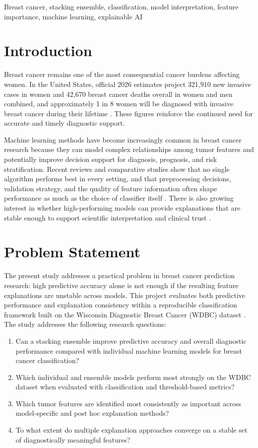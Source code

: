\documentclass[conference]{IEEEtran}
\begin{document}
\begin{IEEEkeywords}
Breast cancer, stacking ensemble, classification, model interpretation, feature importance, machine learning, explainable AI
\end{IEEEkeywords}

\section{Introduction}
Breast cancer remains one of the most consequential cancer burdens affecting women. In the United States, official 2026 estimates project 321,910 new invasive cases in women and 42,670 breast cancer deaths overall in women and men combined, and approximately 1 in 8 women will be diagnosed with invasive breast cancer during their lifetime \cite{b1,b2}. These figures reinforce the continued need for accurate and timely diagnostic support.

Machine learning methods have become increasingly common in breast cancer research because they can model complex relationships among tumor features and potentially improve decision support for diagnosis, prognosis, and risk stratification. Recent reviews and comparative studies show that no single algorithm performs best in every setting, and that preprocessing decisions, validation strategy, and the quality of feature information often shape performance as much as the choice of classifier itself \cite{b3,b4,b5,b6,b12,b13,b14}. There is also growing interest in whether high-performing models can provide explanations that are stable enough to support scientific interpretation and clinical trust \cite{b7,b17,b18,b20}.

\section{Problem Statement}
The present study addresses a practical problem in breast cancer prediction research: high predictive accuracy alone is not enough if the resulting feature explanations are unstable across models. This project evaluates both predictive performance and explanation consistency within a reproducible classification framework built on the Wisconsin Diagnostic Breast Cancer (WDBC) dataset \cite{b8}. The study addresses the following research questions:
\begin{enumerate}[leftmargin=*, itemsep=1pt]
    \item Can a stacking ensemble improve predictive accuracy and overall diagnostic performance compared with individual machine learning models for breast cancer classification?
    \item Which individual and ensemble models perform most strongly on the WDBC dataset when evaluated with classification and threshold-based metrics?
    \item Which tumor features are identified most consistently as important across model-specific and post hoc explanation methods?
    \item To what extent do multiple explanation approaches converge on a stable set of diagnostically meaningful features?
\end{enumerate}
\end{document}
